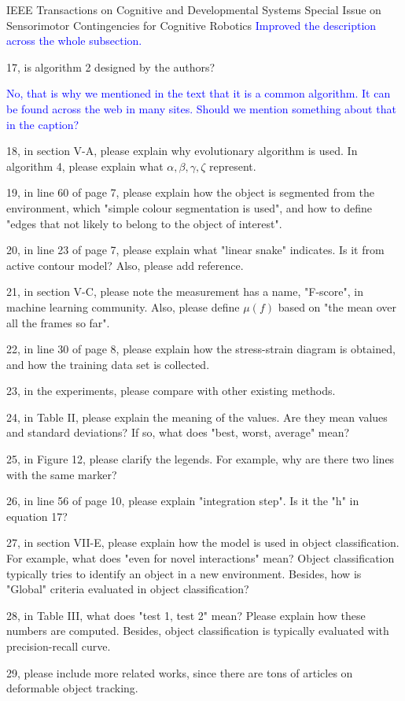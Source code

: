 \documentclass[a4paper,12pt]{letter}
\newcommand{\comment}[1]{\textcolor{blue}{#1}}
\begin{document}
\begin{letter}{IEEE Transactions on Cognitive and Developmental Systems\newline
Special Issue on Sensorimotor Contingencies for Cognitive Robotics}
\comment{Improved the description across the whole subsection.}

17, is algorithm 2 designed by the authors?

\comment{No, that is why we mentioned in the text that it is a common algorithm.  It can be found across the web in many sites.  Should we mention something about that in the caption?}

18, in section V-A, please explain why evolutionary algorithm is used. In algorithm 4, please explain what $\alpha, \beta, \gamma, \zeta$ represent. 

19, in line 60 of page 7, please explain how the object is segmented from the environment, which "simple colour segmentation is used", and how to define "edges that not likely to belong to the object of interest". 

20, in line 23 of page 7, please explain what "linear snake" indicates. Is it from active contour model? Also, please add reference. 

21, in section V-C, please note the measurement has a name, "F-score", in machine learning community. Also, please define $\mu(f)$ based on "the mean over all the frames so far". 

22, in line 30 of page 8, please explain how the stress-strain diagram is obtained, and how the training data set is collected. 

23, in the experiments, please compare with other existing methods. 

24, in Table II, please explain the meaning of the values. Are they mean values and standard deviations? If so, what does "best, worst, average" mean? 

25, in Figure 12, please clarify the legends. For example, why are there two lines with the same marker? 

26, in line 56 of page 10, please explain "integration step". Is it the "h" in equation 17? 

27, in section VII-E, please explain how the model is used in object classification. For example, what does "even for novel interactions" mean? Object classification typically tries to identify an object in a new environment. Besides, how is "Global" criteria evaluated in object classification? 

28, in Table III, what does "test 1, test 2" mean? Please explain how these numbers are computed. Besides, object classification is typically evaluated with precision-recall curve. 

29, please include more related works, since there are tons of articles on deformable object tracking.


\end{letter}
\end{document}
